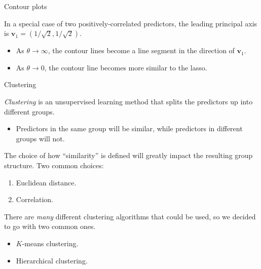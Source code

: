 \documentclass[8pt]{beamer}
\newcommand{\mys}{\vspace{0.5cm} \pause
}
\begin{document}
\begin{frame}[noframenumbering]{Contour plots}

\begin{center}
    \centering
    \textcolor{white}{}
    \textcolor{white}{}
\end{center}

In a special case of two positively-correlated predictors, the leading principal axis is $\bm{v}_1 = (1/\sqrt{2}, 1/\sqrt{2})$.
\begin{itemize}
    \item As $\theta \to \infty$, the contour lines become a line segment in the direction of $\bm{v}_1$.
    \item As $\theta \to 0$, the contour line becomes more similar to the lasso.
\end{itemize}
    
\end{frame}

\begin{frame}{\color{white} Clustering}

\textit{Clustering} is an unsupervised learning method that splits the predictors up into different groups.
\begin{itemize}
    \item Predictors in the same group will be similar, while predictors in different groups will not.
\end{itemize} \mys

The choice of how ``similarity'' is defined will greatly impact the resulting group structure. Two common choices:
\begin{enumerate}
    \item Euclidean distance.
    \item Correlation.
\end{enumerate} \mys

There are \textit{many} different clustering algorithms that could be used, so we decided to go with two common ones.
\begin{itemize}
    \item $K$-means clustering.
    \item Hierarchical clustering.
\end{itemize}
    
\end{frame}
\end{document}
